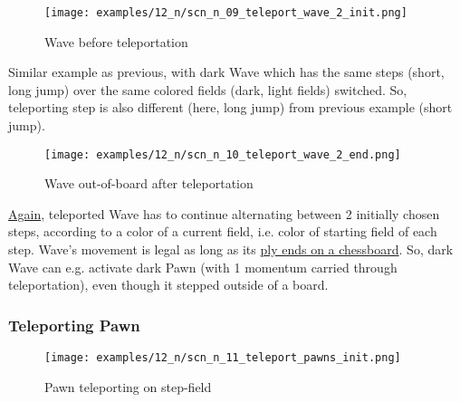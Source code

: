 \vspace*{-1.0\baselineskip}
\noindent
\begin{figure}[!h]
\texttt{[image: examples/12\_n/scn\_n\_09\_teleport\_wave\_2\_init.png]}
\caption{Wave before teleportation}
\label{fig:scn_n_09_teleport_wave_2_init}
\end{figure}

Similar example as previous, with dark Wave which has the same steps (short,
long jump) over the same colored fields (dark, light fields) switched. So,
teleporting step is also different (here, long jump) from previous example
(short jump).

\clearpage %

\vspace*{-2.0\baselineskip}
\noindent
\begin{figure}[!h]
\texttt{[image: examples/12\_n/scn\_n\_10\_teleport\_wave\_2\_end.png]}
\caption{Wave out-of-board after teleportation}
\label{fig:scn_n_10_teleport_wave_2_end}
\end{figure}

\hyperref[fig:scn_n_08_teleport_wave_end]{Again},
teleported Wave has to continue alternating between 2 initially chosen steps,
according to a color of a current field, i.e. color of starting field of each
step. Wave's movement is legal as long as its
\hyperref[fig:scn_mv_27_wave_off_board]{ply ends on a chessboard}. So, dark
Wave can e.g. activate dark Pawn (with 1 momentum carried through teleportation),
even though it stepped outside of a board.

\clearpage %

\subsubsection*{Teleporting Pawn}
\label{sec:Nineteen/Star/Teleporting pieces/Teleporting Pawn}

\vspace*{-1.4\baselineskip}
\noindent
\begin{figure}[!h]
\texttt{[image: examples/12\_n/scn\_n\_11\_teleport\_pawns\_init.png]}
\caption{Pawn teleporting on step-field}
\label{fig:scn_n_11_teleport_pawns_init}
\end{figure}

